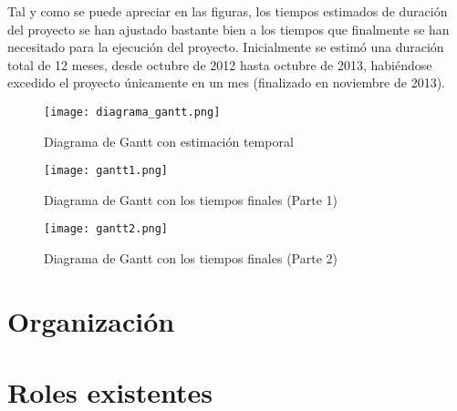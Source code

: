 Tal y como se puede apreciar en las figuras, los tiempos estimados de duración
del proyecto se han ajustado bastante bien a los tiempos que finalmente se han
necesitado para la ejecución del proyecto. Inicialmente se estimó una duración
total de 12 meses, desde octubre de 2012 hasta octubre de 2013, habiéndose
excedido el proyecto únicamente en un mes (finalizado en noviembre de 2013).

\newpage

\begin{figure}[H]
    \begin{center}
        \texttt{[image: diagrama\_gantt.png]}
    \end{center}
    \caption{Diagrama de Gantt con estimación temporal}
    \label{fig:GanttInicial}
\end{figure}

\begin{figure}[H]
    \begin{center}
        \texttt{[image: gantt1.png]}
    \end{center}
    \caption{Diagrama de Gantt con los tiempos finales (Parte 1)}
    \label{fig:GanttFinal1}
\end{figure}

\begin{figure}[H]
    \begin{center}
        \texttt{[image: gantt2.png]}
    \end{center}
    \caption{Diagrama de Gantt con los tiempos finales (Parte 2)}
    \label{fig:GanttFinal2}
\end{figure}

\section{Organización}

\section{Roles existentes}

